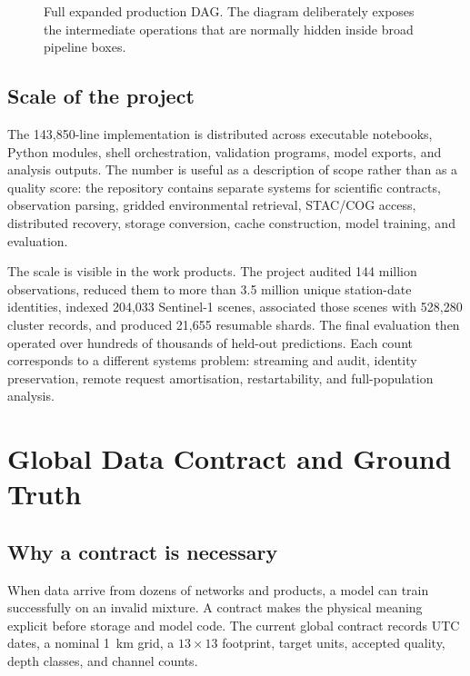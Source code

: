 \documentclass[12pt,a4paper]{report}
\begin{document}
\begin{landscape}
\begin{figure}[H]
\centering

\caption{Full expanded production DAG. The diagram deliberately exposes the intermediate operations that are normally hidden inside broad pipeline boxes.}
\label{fig:full-dag}
\end{figure}
\end{landscape}

\subsection{Scale of the project}
The 143,850-line implementation is distributed across executable notebooks,
Python modules, shell orchestration, validation programs, model exports, and
analysis outputs. The number is useful as a description of scope rather than
as a quality score: the repository contains separate systems for scientific
contracts, observation parsing, gridded environmental retrieval, STAC/COG
access, distributed recovery, storage conversion, cache construction, model
training, and evaluation.

The scale is visible in the work products. The project audited 144 million
observations, reduced them to more than 3.5 million unique station-date
identities, indexed 204,033 Sentinel-1 scenes, associated those scenes with
528,280 cluster records, and produced 21,655 resumable shards. The final
evaluation then operated over hundreds of thousands of held-out predictions.
Each count corresponds to a different systems problem: streaming and audit,
identity preservation, remote request amortisation, restartability, and
full-population analysis.

\section{Global Data Contract and Ground Truth}

\subsection{Why a contract is necessary}
When data arrive from dozens of networks and products, a model can train
successfully on an invalid mixture. A contract makes the physical meaning
explicit before storage and model code. The current global contract records
UTC dates, a nominal 1~km grid, a $13\times13$ footprint, target units,
accepted quality, depth classes, and channel counts.
\end{document}
